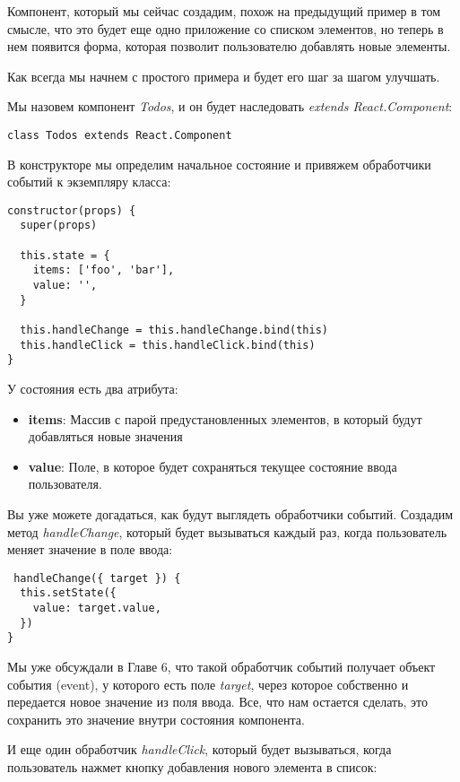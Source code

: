 Компонент, который мы сейчас создадим, похож на предыдущий пример в том смысле, что это будет еще одно приложение со списком элементов, но теперь в нем появится форма, которая позволит пользователю добавлять новые элементы.

Как всегда мы начнем с простого примера и будет его шаг за шагом улучшать.

Мы назовем компонент \textit{Todos}, и он будет наследовать \textit{extends React.Component}:

\begin{lstlisting}
class Todos extends React.Component
\end{lstlisting}

В конструкторе мы определим начальное состояние и привяжем обработчики событий к экземпляру класса:

\begin{lstlisting}
constructor(props) {
  super(props)
  
  this.state = {
    items: ['foo', 'bar'],
    value: '',
  }

  this.handleChange = this.handleChange.bind(this)
  this.handleClick = this.handleClick.bind(this)
}
\end{lstlisting}

У состояния есть два атрибута:

\begin{itemize}
  \item \textbf{items}: Массив с парой предустановленных элементов, в который будут добавляться новые значения
  \item \textbf{value}: Поле, в которое будет сохраняться текущее состояние ввода пользователя.
\end{itemize}

Вы уже можете догадаться, как будут выглядеть обработчики событий. Создадим метод \textit{handleChange}, который будет вызываться каждый раз, когда пользователь меняет значение в поле ввода:

\begin{lstlisting}
 handleChange({ target }) {
  this.setState({
    value: target.value,
  })
}
\end{lstlisting}

Мы уже обсуждали в Главе 6, что такой обработчик событий получает объект события (event), у которого есть поле \textit{target}, через которое собственно и передается новое значение из поля ввода. Все, что нам остается сделать, это сохранить это значение внутри состояния компонента.

И еще один обработчик \textit{handleClick}, который будет вызываться, когда пользователь нажмет кнопку добавления нового элемента в список:

